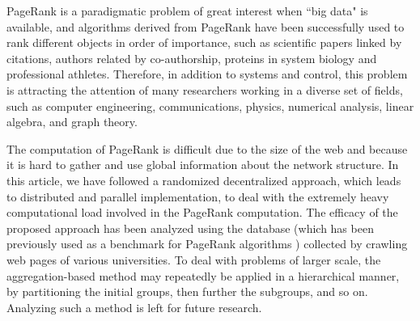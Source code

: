 \documentclass[11pt,draftcls,onecolumn]{IEEEtran}
\begin{document}
PageRank is a paradigmatic problem 
of great interest when ``big data" is available, and algorithms derived 
from PageRank have been successfully used to rank different objects in 
order of importance, such as scientific papers linked by citations, 
authors related by co-authorship, proteins in system biology and professional 
athletes. Therefore, in addition to systems and control, this problem is 
attracting the attention of many researchers working in a diverse set of fields, 
such as computer engineering, communications, physics, numerical analysis, 
linear algebra, and graph theory. 

The computation of PageRank is difficult due to the size of the web and because it is hard to gather and use global information about the network structure. 
In this article, we have followed a randomized decentralized approach, which leads to distributed
and parallel implementation, 
to deal with the extremely heavy computational load involved in the PageRank computation. The efficacy of the proposed approach
has been analyzed using the database \cite{webdata} 
(which has been previously used as a benchmark for PageRank algorithms \cite{FABG:13})
collected by crawling web pages of various universities.
To deal with problems of larger scale, the aggregation-based method
may repeatedly be applied in a hierarchical manner, by partitioning the initial groups,
then further the subgroups, and so on. 
Analyzing such a method is left for future research.
\end{document}
